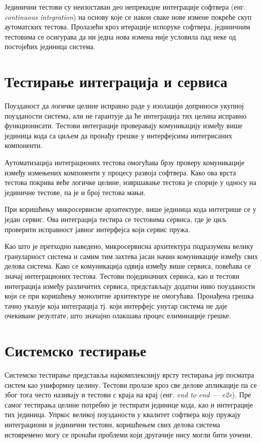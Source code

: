 \documentclass[12pt,oneside]{memoir}
\begin{document}
Јединични тестови су неизоставан део непрекидне интеграције софтвера (енг. \textit{continuous integration}) на основу које се након сваке нове измене покреће скуп аутоматских тестова. Пролазећи кроз итерације испоруке софтвера, јединичним тестовима се осигурава да ни једна нова измена није условила пад неке од постојећих јединица система.

\section{Тестирање интеграција и сервиса}

Поузданост да логичке целине исправно раде у изолацији доприноси укупној поузданости система, али не гарантује да ће интеграција тих целина исправно функционисати. Тестови интеграције проверавају комуникацију између више јединица кода са циљем да пронађу грешке у интерфејсима интегрисаних компоненти.

Аутоматизација интеграционих тестова омогућава брзу проверу комуникације између измењених компоненти у процесу развоја софтвера. Како ова врста тестова покрива веће логичке целине, извршавање тестова је спорије у односу на јединичне тестове, па је и број тестова мањи. 

При коришћењу микросервисне архитектуре, више јединица кода интегрише се у један сервис. Ова интеграција тестира се тестовима сервиса, где је циљ проверити исправност јавног интерфејса који сервис пружа. 

Као што је претходно наведено, микросервисна архитектура подразумева велику грануларност система и самим тим захтева јасан начин комуникације између свих делова система. Како се комуникација одвија између више сервиса, повећава се значај интеграционих тестова. Тестови појединачних сервиса, као и тестови интеграција између различитих сервиса, представљају додатни ниво поузданости који се при коришћењу монолитне архитектуре не омогућава. Пронађена грешка тачно указује која интеграција тј. који интерфејс унутар система не даје очекиване резултате, што значајно олакшава процес елиминације грешке.


\section{Системско тестирање}

Системско тестирање представља најкомплекснију врсту тестирања јер посматра систем као униформну целину. Тестови пролазе кроз све делове апликације па се због тога често називају и тестови с краја на крај (енг.\textit{ end to end --- e2e}). Пре самог тестирања целине потребно је тестирати јединице кода, као и интеграције тих јединица. Упркос великој поузданости у квалитет софтвера коју пружају интеграциони и јединични тестови, коришћењем свих делова система истовремено могу се пронаћи проблеми који другачије нису могли бити уочени.
\end{document}
